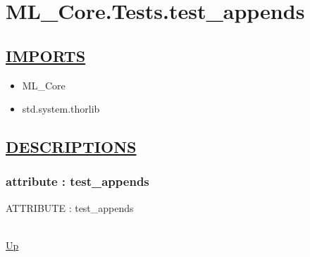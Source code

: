 \chapter*{ML\_Core.Tests.test\_appends}
\hypertarget{ML_Core.Tests.test_appends}{}

\section*{\underline{IMPORTS}}
\begin{itemize}
\item ML\_Core
\item std.system.thorlib
\end{itemize}

\section*{\underline{DESCRIPTIONS}}
\subsection*{attribute : test\_appends}
\hypertarget{ecldoc:ml_core.tests.test_appends}{ATTRIBUTE : test\_appends} \\
\hyperlink{ecldoc:}{Up} \\
\par

